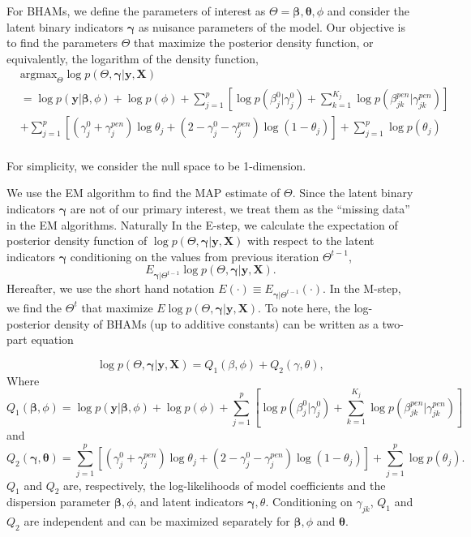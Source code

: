 \documentclass[AMA,STIX1COL,]{WileyNJD-v2}
\begin{document}
For BHAMs, we define the parameters of interest as
\(\Theta = {\boldsymbol{\beta}, \boldsymbol{\theta}, \phi}\) and
consider the latent binary indicators \(\boldsymbol{\gamma}\) as
nuisance parameters of the model. Our objective is to find the
parameters \(\Theta\) that maximize the posterior density function, or
equivalently, the logarithm of the density function, \[
\begin{aligned}
& \text{argmax}_{\Theta}
\log p(\Theta, \boldsymbol{\gamma}| \textbf{y}, \textbf{X}) \\
&= \log p(\textbf{y}|\boldsymbol{\beta}, \phi) + \log p(\phi) + \sum\limits_{j=1}^p\left[\log p(\beta^0_j|\gamma^0_j)+\sum\limits_{k=1}^{K_j} \log p(\beta^{pen}_{jk}|\gamma^{pen}_{jk})\right]\\
& +\sum\limits_{j=1}^{p} \left[ (\gamma^0_j+\gamma_{j}^{pen})\log \theta_j + (2-\gamma^0_j-\gamma_{j}^{pen}) \log (1-\theta_j)\right] +  \sum\limits_{j=1}^{p}\log p(\theta_j)
\end{aligned}
\]\\
For simplicity, we consider the null space to be 1-dimension.

We use the EM algorithm to find the MAP estimate of \(\Theta\). Since
the latent binary indicators \(\boldsymbol{\gamma}\) are not of our
primary interest, we treat them as the ``missing data'' in the EM
algorithms. Naturally In the E-step, we calculate the expectation of
posterior density function of
\(\log p(\Theta, \boldsymbol{\gamma}| \textbf{y}, \textbf{X})\) with
respect to the latent indicators \(\boldsymbol{\gamma}\) conditioning on
the values from previous iteration \(\Theta^{t-1}\), \[
E_{\boldsymbol{\gamma}|\Theta^{t-1}}\log p(\Theta, \boldsymbol{\gamma}| \textbf{y}, \textbf{X}) .
\] Hereafter, we use the short hand notation
\(E(\cdot)\equiv E_{\boldsymbol{\gamma}|\Theta^{t-1}}(\cdot)\). In the
M-step, we find the \(\Theta^{t}\) that maximize
\(E\log p(\Theta, \boldsymbol{\gamma}| \textbf{y}, \textbf{X})\). To
note here, the log-posterior density of BHAMs (up to additive constants)
can be written as a two-part equation

\[ \log p(\Theta, \boldsymbol{\gamma}| \textbf{y}, \textbf{X}) = Q_1(\beta, \phi) + Q_2 (\gamma,\theta),\]
Where
\[ Q_1(\boldsymbol{\beta}, \phi) = \log p(\textbf{y}|\boldsymbol{\beta}, \phi) + \log p(\phi) + \sum\limits_{j=1}^p\left[\log p(\beta^0_j|\gamma^0_j)+\sum\limits_{k=1}^{K_j} \log p(\beta^{pen}_{jk}|\gamma^{pen}_{jk})\right]\]
and \[
Q_2(\boldsymbol{\gamma},\boldsymbol{\theta}) = \sum\limits_{j=1}^{p} \left[ (\gamma^0_j+\gamma_{j}^{pen})\log \theta_j + (2-\gamma^0_j-\gamma_{j}^{pen}) \log (1-\theta_j)\right] +  \sum\limits_{j=1}^{p}\log p(\theta_j) .\]
\(Q_1\) and \(Q_2\) are, respectively, the log-likelihoods of model
coefficients and the dispersion parameter \(\boldsymbol{\beta}, \phi\),
and latent indicators \(\boldsymbol{\gamma}, \theta\). Conditioning on
\(\gamma_{jk}\), \(Q_1\) and \(Q_2\) are independent and can be
maximized separately for \(\boldsymbol{\beta}, \phi\) and
\(\boldsymbol{\theta}\).
\end{document}
